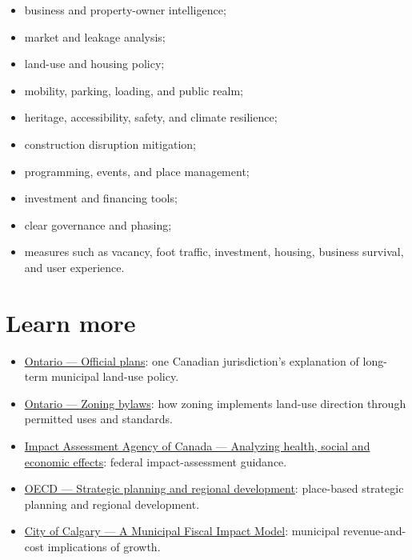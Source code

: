 \documentclass[11pt,letterpaper,oneside,openany]{book}
\newif\ifsectionhasicon
\newcommand{\currentsectionicon}{}
\newcommand{\marginsection}[2]{%
  \begingroup
  \sectionhasicontrue
  \def\currentsectionicon{#1}%
  \section[#2]{#2}%
  \endgroup
}
\begin{document}
\begin{itemize}
\item business and property-owner intelligence;
\item market and leakage analysis;
\item land-use and housing policy;
\item mobility, parking, loading, and public realm;
\item heritage, accessibility, safety, and climate resilience;
\item construction disruption mitigation;
\item programming, events, and place management;
\item investment and financing tools;
\item clear governance and phasing;
\item measures such as vacancy, foot traffic, investment, housing, business survival, and user experience.
\end{itemize}


\marginsection{external-link}{Learn more}
\begin{itemize}
\item \href{https://www.ontario.ca/document/citizens-guide-land-use-planning/official-plans}{Ontario --- Official plans}: one Canadian jurisdiction's explanation of long-term municipal land-use policy.
\item \href{https://www.ontario.ca/document/citizens-guide-land-use-planning/zoning-bylaws}{Ontario --- Zoning bylaws}: how zoning implements land-use direction through permitted uses and standards.
\item \href{https://www.canada.ca/en/impact-assessment-agency/services/policy-guidance/practitioners-guide-impact-assessment-act/analyzing-health-social-economic-effects-impact-assessment-act.html}{Impact Assessment Agency of Canada --- Analyzing health, social and economic effects}: federal impact-assessment guidance.
\item \href{https://www.oecd.org/en/topics/sub-issues/strategic-planning-and-regional-development.html}{OECD --- Strategic planning and regional development}: place-based strategic planning and regional development.
\item \href{https://www.calgary.ca/content/dam/www/cfod/finance/documents/corporate-economics/other-reports/municipal-fiscal-impact-model.pdf}{City of Calgary --- A Municipal Fiscal Impact Model}: municipal revenue-and-cost implications of growth.
\end{itemize}
\end{document}
